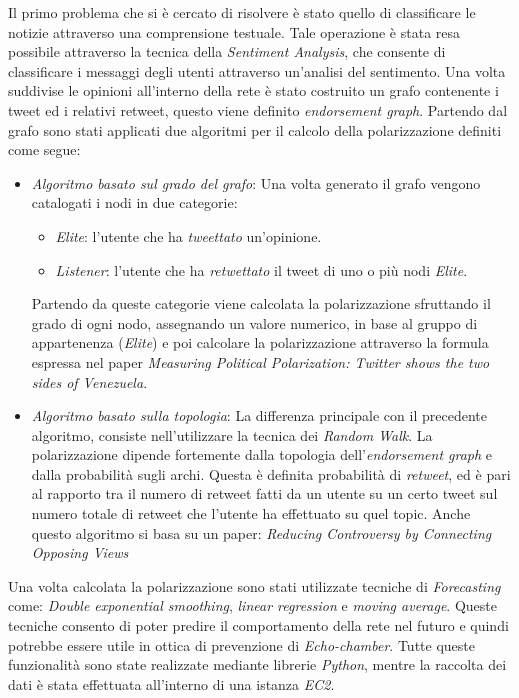 \documentclass[a4paper,12pt]{article}
\begin{document}
Il primo problema che si è cercato di risolvere è stato quello di classificare le notizie attraverso una comprensione testuale. Tale operazione è stata resa possibile attraverso la tecnica della \textit{Sentiment Analysis}, che consente di classificare i messaggi degli utenti attraverso un'analisi del sentimento. 
Una volta suddivise le opinioni all'interno della rete è stato costruito un grafo contenente i tweet ed i relativi retweet, questo viene definito \textit{endorsement graph}.
Partendo dal grafo sono stati applicati due algoritmi per il calcolo della polarizzazione definiti come segue:
\begin{itemize}
\item \textit{Algoritmo basato sul grado del grafo}: Una volta generato il grafo vengono catalogati i nodi in due categorie:
\begin{itemize}
\item \textit{Elite}: l'utente che ha \textit{tweettato} un'opinione.
\item \textit{Listener}: l'utente che ha \textit{retwettato} il tweet di uno o più nodi \textit{Elite}.
\end{itemize}
Partendo da queste categorie viene calcolata la polarizzazione sfruttando il grado di ogni nodo, assegnando un valore numerico, in base al gruppo di appartenenza (\textit{Elite}) e poi calcolare la polarizzazione attraverso la formula espressa nel paper \textit{Measuring Political Polarization: Twitter shows the two sides of Venezuela}.
\item \textit{Algoritmo basato sulla topologia}: La differenza principale con il precedente algoritmo, consiste nell'utilizzare la tecnica dei \textit{Random Walk}. La polarizzazione dipende fortemente dalla topologia dell'\textit{endorsement graph} e dalla probabilità sugli archi. Questa è definita probabilità di \textit{retweet}, ed è pari al rapporto tra il numero di retweet fatti da un utente su un certo tweet sul numero totale di retweet che l'utente ha effettuato su quel topic. Anche questo algoritmo si basa su un paper: \textit{Reducing Controversy by Connecting Opposing Views}
\end{itemize}
Una volta calcolata la polarizzazione sono stati utilizzate tecniche di \textit{Forecasting} come: \textit{Double exponential smoothing}, \textit{linear regression} e \textit{moving average}. Queste tecniche consento di poter predire il comportamento della rete nel futuro e quindi potrebbe essere utile in ottica di prevenzione di \textit{Echo-chamber}. Tutte queste funzionalità sono state realizzate mediante librerie \textit{Python}, mentre la raccolta dei dati è stata effettuata all'interno di una istanza \textit{EC2}.
\end{document}
